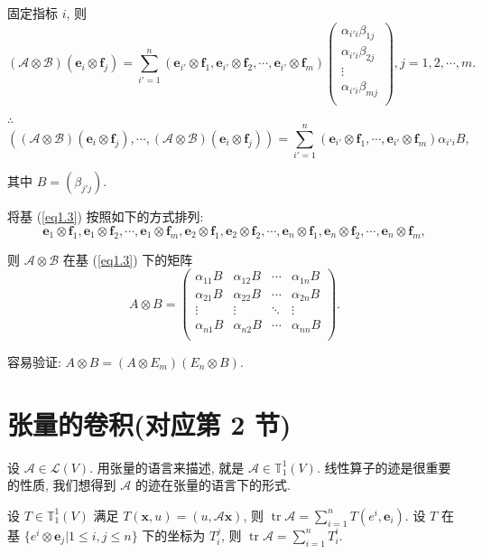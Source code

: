 \documentclass{ctexart}
\begin{document}
固定指标 $i$, 则
\[(\mathcal{A}\otimes\mathcal{B})(\boldsymbol{e}_i\otimes\boldsymbol{f}_j)=\sum\limits_{i'=1}^n(\boldsymbol{e}_{i'}\otimes\boldsymbol{f}_1,\boldsymbol{e}_{i'}\otimes\boldsymbol{f}_2,\cdots,\boldsymbol{e}_{i'}\otimes\boldsymbol{f}_m)\begin{pmatrix}
    \alpha_{i'i}\beta_{1j} \\
    \alpha_{i'i}\beta_{2j} \\
    \vdots \\
    \alpha_{i'i}\beta_{mj} \\
\end{pmatrix}, j=1,2,\cdots,m.\]

$\therefore$
\[((\mathcal{A}\otimes\mathcal{B})(\boldsymbol{e}_i\otimes\boldsymbol{f}_j),\cdots,(\mathcal{A}\otimes\mathcal{B})(\boldsymbol{e}_i\otimes\boldsymbol{f}_j))=\sum\limits_{i'=1}^n(\boldsymbol{e}_{i'}\otimes\boldsymbol{f}_1,\cdots,\boldsymbol{e}_{i'}\otimes\boldsymbol{f}_m)\alpha_{i'i}B,\]

其中 $B=(\beta_{j'j})$.

将基 (\ref{eq1.3}) 按照如下的方式排列:
\[\boldsymbol{e}_1\otimes\boldsymbol{f}_1,\boldsymbol{e}_1\otimes\boldsymbol{f}_2,\cdots,\boldsymbol{e}_1\otimes\boldsymbol{f}_m,\boldsymbol{e}_2\otimes\boldsymbol{f}_1,\boldsymbol{e}_2\otimes\boldsymbol{f}_2,\cdots,\boldsymbol{e}_n\otimes\boldsymbol{f}_1,\boldsymbol{e}_n\otimes\boldsymbol{f}_2,\cdots,\boldsymbol{e}_n\otimes\boldsymbol{f}_m,\]

则
$\mathcal{A}\otimes\mathcal{B}$ 在基 (\ref{eq1.3}) 下的矩阵
\[A\otimes B=\begin{pmatrix}
    \alpha_{11}B & \alpha_{12}B & \cdots & \alpha_{1n}B \\
    \alpha_{21}B & \alpha_{22}B & \cdots & \alpha_{2n}B \\
    \vdots & \vdots & \ddots & \vdots \\
    \alpha_{n1}B & \alpha_{n2}B & \cdots & \alpha_{nn}B \\
\end{pmatrix}.\]

容易验证: $A\otimes B=(A\otimes E_m)(E_n\otimes B)$.
\section{张量的卷积(对应第 2 节)}
设 $\mathcal{A}\in\mathcal{L}(V)$. 用张量的语言来描述, 就是 $\mathcal{A}\in\mathbb{T}_1^1(V)$. 线性算子的迹是很重要的性质, 我们想得到 $\mathcal{A}$ 的迹在张量的语言下的形式.

设 $T\in\mathbb{T}_1^1(V)$ 满足 $T(\boldsymbol{x},u)=(u,\mathcal{A}\boldsymbol{x})$, 则 $\operatorname{tr}\mathcal{A}=\sum\limits_{i=1}^nT(e^i,\boldsymbol{e}_i)$. 设 $T$ 在基 $\{e^i\otimes\boldsymbol{e}_j|1\leq i,j\leq n\}$ 下的坐标为 $T_i^j$, 则 $\operatorname{tr}\mathcal{A}=\sum\limits_{i=1}^nT_i^i$.
\end{document}
